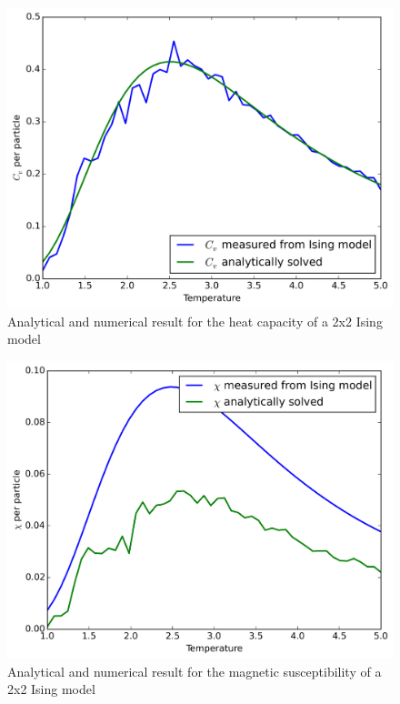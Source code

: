 \documentclass[11pt,a4paper,draft]{article}
\numberwithin{equation}{section}
\newcommand{\figurewidth}{.85\textwidth}
\begin{document}
\begin{figure}
\centering
\includegraphics[width=\figurewidth]{pics/acv.png}
\caption{Analytical and numerical result for the heat capacity 
of a 2x2 Ising model}
\label{fig:acv}
\end{figure}

\begin{figure}
\centering
\includegraphics[width=\figurewidth]{pics/achi.png}
\caption{Analytical and numerical result for the magnetic susceptibility
of a 2x2 Ising model}
\label{fig:achi}
\end{figure}
\end{document}
